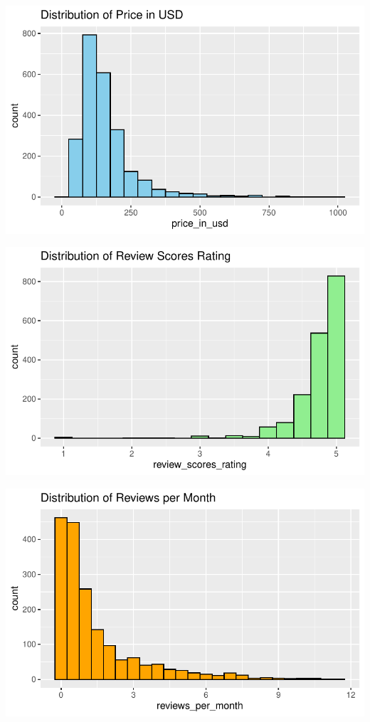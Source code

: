 \documentclass[
  journal,
]{IEEEtran}%
\begin{document}
\includegraphics{main_files/figure-pdf/eda-1.pdf}

\includegraphics{main_files/figure-pdf/eda-2.pdf}

\includegraphics{main_files/figure-pdf/eda-3.pdf}
\end{document}
